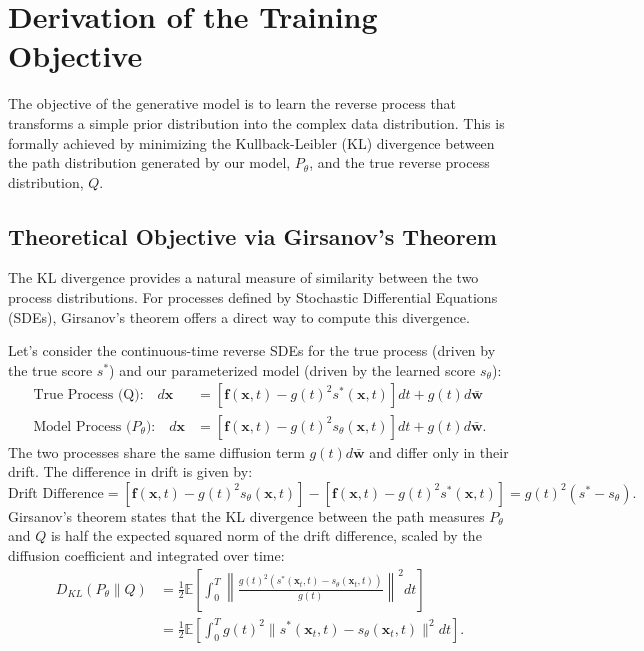 \documentclass{article}
\begin{document}
\section{Derivation of the Training Objective}
\label{sec:objectives}
The objective of the generative model is to learn the reverse process that transforms a simple prior distribution into the complex data distribution. This is formally achieved by minimizing the Kullback-Leibler (KL) divergence between the path distribution generated by our model, $P_\theta$, and the true reverse process distribution, $Q$.

\subsection{Theoretical Objective via Girsanov's Theorem}
The KL divergence provides a natural measure of similarity between the two process distributions. For processes defined by Stochastic Differential Equations (SDEs), Girsanov's theorem offers a direct way to compute this divergence.

Let's consider the continuous-time reverse SDEs for the true process (driven by the true score $s^*$) and our parameterized model (driven by the learned score $s_\theta$):
\begin{align*}
    \text{True Process (Q):} \quad d\mathbf{x} &= \left[\mathbf{f}(\mathbf{x}, t) - g(t)^2 s^*(\mathbf{x}, t)\right]dt + g(t)d\bar{\mathbf{w}} \\
    \text{Model Process ($P_\theta$):} \quad d\mathbf{x} &= \left[\mathbf{f}(\mathbf{x}, t) - g(t)^2 s_\theta(\mathbf{x}, t)\right]dt + g(t)d\bar{\mathbf{w}}.
\end{align*}
The two processes share the same diffusion term $g(t)d\bar{\mathbf{w}}$ and differ only in their drift. The difference in drift is given by:
\[
\text{Drift Difference} = \left[\mathbf{f}(\mathbf{x}, t) - g(t)^2 s_\theta(\mathbf{x}, t)\right] - \left[\mathbf{f}(\mathbf{x}, t) - g(t)^2 s^*(\mathbf{x}, t)\right] = g(t)^2 (s^* - s_\theta).
\]
Girsanov's theorem states that the KL divergence between the path measures $P_\theta$ and $Q$ is half the expected squared norm of the drift difference, scaled by the diffusion coefficient and integrated over time:
\begin{align}
    D_{KL}(P_\theta \| Q) &= \frac{1}{2} \mathbb{E} \left[ \int_0^T \left\| \frac{g(t)^2 (s^*(\mathbf{x}_t, t) - s_\theta(\mathbf{x}_t, t))}{g(t)} \right\|^2 dt \right] \nonumber \\
    &= \frac{1}{2} \mathbb{E} \left[ \int_0^T g(t)^2 \|s^*(\mathbf{x}_t, t) - s_\theta(\mathbf{x}_t, t)\|^2 dt \right].
\end{align}
\end{document}

